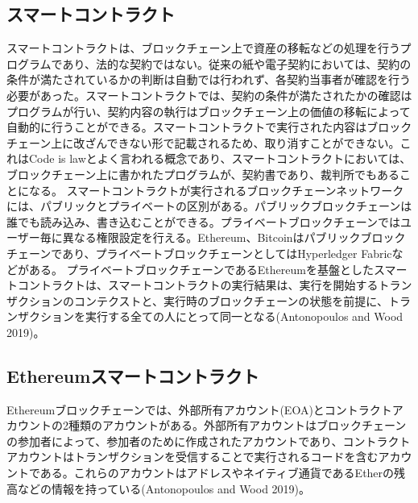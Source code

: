 \documentclass[a4paper,fontsize=11pt,report,notitlepage,line_length=38zw,number_of_lines=40,dvipdfmx]{jlreq}
\begin{document}
\subsection{スマートコントラクト}
スマートコントラクトは、ブロックチェーン上で資産の移転などの処理を行うプログラムであり、法的な契約ではない。従来の紙や電子契約においては、契約の条件が満たされているかの判断は自動では行われず、各契約当事者が確認を行う必要があった。スマートコントラクトでは、契約の条件が満たされたかの確認はプログラムが行い、契約内容の執行はブロックチェーン上の価値の移転によって自動的に行うことができる。スマートコントラクトで実行された内容はブロックチェーン上に改ざんできない形で記載されるため、取り消すことができない。これはCode is lawとよく言われる概念であり、スマートコントラクトにおいては、ブロックチェーン上に書かれたプログラムが、契約書であり、裁判所でもあることになる\cite{nagasawa2013}。
スマートコントラクトが実行されるブロックチェーンネットワークには、パブリックとプライベートの区別がある。パブリックブロックチェーンは誰でも読み込み、書き込むことができる。プライベートブロックチェーンではユーザー毎に異なる権限設定を行える。Ethereum、Bitcoinはパブリックブロックチェーンであり、プライベートブロックチェーンとしてはHyperledger Fabricなどがある。
プライベートブロックチェーンであるEthereumを基盤としたスマートコントラクトは、スマートコントラクトの実行結果は、実行を開始するトランザクションのコンテクストと、実行時のブロックチェーンの状態を前提に、トランザクションを実行する全ての人にとって同一となる(Antonopoulos and Wood 2019)\cite{antonopoulos2019}。

\subsection{Ethereumスマートコントラクト}
Ethereumブロックチェーンでは、外部所有アカウント(EOA)とコントラクトアカウントの2種類のアカウントがある。外部所有アカウントはブロックチェーンの参加者によって、参加者のために作成されたアカウントであり、コントラクトアカウントはトランザクションを受信することで実行されるコードを含むアカウントである。これらのアカウントはアドレスやネイティブ通貨であるEtherの残高などの情報を持っている(Antonopoulos and Wood 2019)\cite{antonopoulos2019}。
\end{document}
